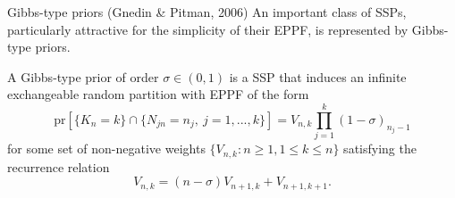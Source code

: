 \documentclass[11pt, handout]{beamer}
\begin{document}
\begin{frame}{Gibbs-type priors (Gnedin \& Pitman, 2006)}
    An important class of SSPs, particularly attractive for the simplicity of their EPPF, is represented by Gibbs-type priors.
    \begin{definition}
        A Gibbs-type prior of order \(\sigma \in (0, 1)\) is a SSP that induces an infinite exchangeable random partition with EPPF of the form
        \begin{equation*}
            \text{pr}[\{K_n = k\} \cap \{N_{jn} = n_j,\ j = 1,...,k\}] = V_{n,k} \prod_{j=1}^k (1 - \sigma)_{n_j - 1}
        \end{equation*}
        for some set of non-negative weights \(\{V_{n, k} \colon n \geq 1, 1 \leq k \leq n\}\) satisfying the recurrence relation
        \begin{equation}
            \label{eq:recurrence}
            V_{n, k} = (n - \sigma) V_{n +1, k} + V_{n + 1, k + 1}.
        \end{equation}
    \end{definition}
\end{frame}
\end{document}
